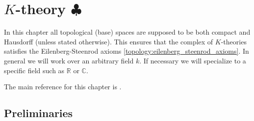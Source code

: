 \chapter{\texorpdfstring{$K$-theory $\clubsuit$}{K-theory}}

    In this chapter all topological (base) spaces are supposed to be both compact and Hausdorff (unless stated otherwise). This ensures that the complex of $K$-theories satisfies the Eilenberg-Steenrod axioms \ref{topology:eilenberg_steenrod_axioms}. In general we will work over an arbitrary field $k$. If necessary we will specialize to a specific field such as $\mathbb{R}$ or $\mathbb{C}$.

    The main reference for this chapter is \cite{karoubi}.

\section{Preliminaries}

